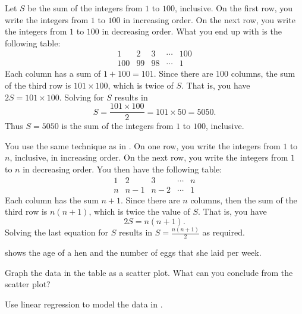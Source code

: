 \documentclass[a4paper,oneside,12pt]{article}
\begin{document}
\begin{problem}
{\begin{solution}
Let $S$ be the sum of the integers from $1$ to $100$, inclusive.  On
the first row, you write the integers from $1$ to $100$ in increasing
order.  On the next row, you write the integers from $1$ to $100$ in
decreasing order.  What you end up with is the following table:
\[
\begin{matrix}
1   & 2  & 3  & \cdots & 100 \\[4pt]
100 & 99 & 98 & \cdots & 1
\end{matrix}
\]
Each column has a sum of $1 + 100 = 101$.  Since there are $100$
columns, the sum of the third row is $101 \times 100$, which is twice
of $S$.  That is, you have $2S = 101 \times 100$.  Solving for $S$
results in
\[
S
=
\frac{101 \times 100}{2}
=
101 \times 50
=
5050.
\]
Thus $S = 5050$ is the sum of the integers from $1$ to $100$,
inclusive.

You use the same technique as
in .  On one row,
you write the integers from $1$ to $n$, inclusive, in increasing
order.  On the next row, you write the integers from $1$ to $n$ in
decreasing order.  You then have the following table:
\[
\begin{matrix}
1 & 2   & 3   & \cdots & n \\[4pt]
n & n-1 & n-2 & \cdots & 1
\end{matrix}
\]
Each column has the sum $n + 1$.  Since there are $n$ columns, then
the sum of the third row is $n(n + 1)$, which is twice the value of
$S$.  That is, you have
\[
2S
=
n(n + 1).
\]
Solving the last equation for $S$ results in $S = \frac{n(n+1)}{2}$ as
required.
\end{solution}
}{}

\begin{table}[!htbp]
\centering

\caption{%
  The age of a hen versus the number of eggs that she laid per week.
  Age is measured in months.
}
\label{tab:age_egg}
\end{table}

\item {} shows the age of a hen and the number of
  eggs that she laid per week.
  \begin{packedenum}
  \item\label{subprob:hen_eggs_scatterplot}
    Graph the data in the table as a scatter plot.  What can you
    conclude from the scatter plot?

  \item\label{subprob:hen_eggs_regression}
    Use linear regression to model the data in .


\end{packedenum}
\end{problem}
\end{document}
